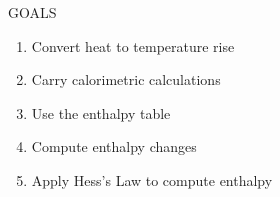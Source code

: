 \documentclass[main.tex]{subfiles}
\begin{document}
\begin{marginfigure}%
\begin{mytcbox}{GOALS}
\begin{enumerate}[label=\protect\circled{\color{white}\arabic*}]
\item Convert heat to temperature rise
\item Carry calorimetric calculations
\item Use the enthalpy table
\item Compute enthalpy changes
\item Apply Hess's Law to compute enthalpy
\end{enumerate}
\end{mytcbox}
\end{marginfigure}%
\end{document}

